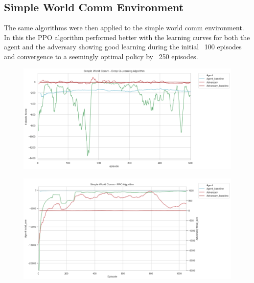 \documentclass{article}
\begin{document}
\subsection{Simple World Comm Environment}

The same algorithms were then applied to the simple world comm environment.
In this the PPO algorithm performed better with the learning curves for both the agent and the adversary showing good learning during the initial ~100 episodes and convergence to a seemingly optimal policy by ~250 episodes.




\begin{figure}[!ht]
  \hspace*{-1cm}
  \centering
  \begin{minipage}{.6\linewidth} 
    \centering
    \includegraphics[width=\linewidth]{world_comm_DQN.png}
    \label{fig:DQNCOMM}
  \end{minipage}%
  \begin{minipage}{.6\linewidth}
    \centering
    \includegraphics[width=\linewidth]{world_comm_PPO.png}
    \label{fig:PPOCOMM}
  \end{minipage}
\end{figure}
\end{document}
